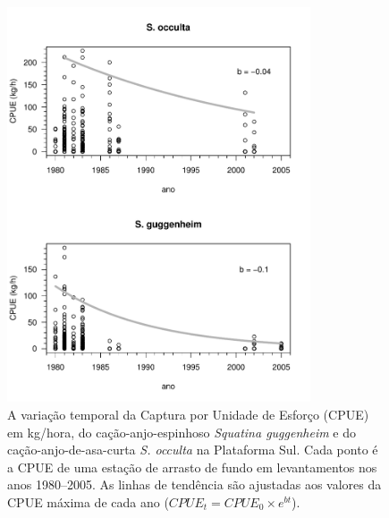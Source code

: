 \documentclass[a4paper,11pt,twoside,showtrims,onecolumn,openright,final]{memoir}
\begin{document}
\begin{figure}
\begin{center}
\includegraphics[width=0.8\textwidth]{ANJOS_CPUEXDECADAS}
\end{center}
\caption[Variação temporal da Captura por Unidade de Esforço em kg/hora de arrasto de fundo, 
	 do cação-anjo-espinhoso \emph{Squatina guggenheim} e do cação-anjo-de-asa-curta \emph{S. occulta} 
	 na Plataforma Sul]
	{A variação temporal da  Captura por Unidade de Esforço (CPUE) em kg/hora, 
	 do cação-anjo-espinhoso \emph{Squatina guggenheim} e do cação-anjo-de-asa-curta \emph{S. occulta} 
	 na Plataforma Sul. 
	 Cada ponto é a CPUE de uma estação de arrasto de fundo em levantamentos 
	 nos anos 1980--2005. As linhas de tendência são ajustadas aos valores 
	 da CPUE máxima de cada ano ($CPUE_{t} = CPUE_{0} \times e^{bt}$).}
\label{fig:anjos-cpue-porano-dadospreteritos}
\end{figure}



%
\end{document}
